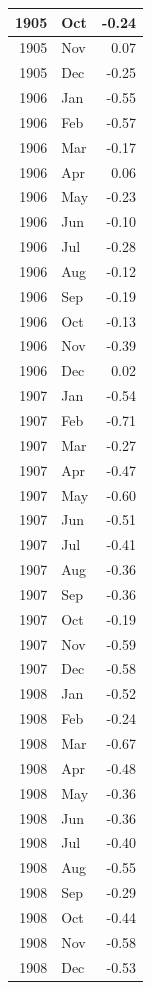 \documentclass[
]{article}
\begin{document}
\begin{table}[H]
\begin{tabular}[t]{r|l|r}
\hline
1905 & Oct & -0.24\\
\hline
1905 & Nov & 0.07\\
\hline
1905 & Dec & -0.25\\
\hline
1906 & Jan & -0.55\\
\hline
1906 & Feb & -0.57\\
\hline
1906 & Mar & -0.17\\
\hline
1906 & Apr & 0.06\\
\hline
1906 & May & -0.23\\
\hline
1906 & Jun & -0.10\\
\hline
1906 & Jul & -0.28\\
\hline
1906 & Aug & -0.12\\
\hline
1906 & Sep & -0.19\\
\hline
1906 & Oct & -0.13\\
\hline
1906 & Nov & -0.39\\
\hline
1906 & Dec & 0.02\\
\hline
1907 & Jan & -0.54\\
\hline
1907 & Feb & -0.71\\
\hline
1907 & Mar & -0.27\\
\hline
1907 & Apr & -0.47\\
\hline
1907 & May & -0.60\\
\hline
1907 & Jun & -0.51\\
\hline
1907 & Jul & -0.41\\
\hline
1907 & Aug & -0.36\\
\hline
1907 & Sep & -0.36\\
\hline
1907 & Oct & -0.19\\
\hline
1907 & Nov & -0.59\\
\hline
1907 & Dec & -0.58\\
\hline
1908 & Jan & -0.52\\
\hline
1908 & Feb & -0.24\\
\hline
1908 & Mar & -0.67\\
\hline
1908 & Apr & -0.48\\
\hline
1908 & May & -0.36\\
\hline
1908 & Jun & -0.36\\
\hline
1908 & Jul & -0.40\\
\hline
1908 & Aug & -0.55\\
\hline
1908 & Sep & -0.29\\
\hline
1908 & Oct & -0.44\\
\hline
1908 & Nov & -0.58\\
\hline
1908 & Dec & -0.53\\

\end{tabular}
\end{table}
\end{document}

